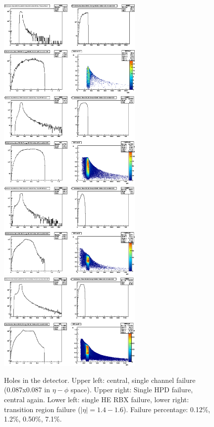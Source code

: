 \documentclass{fheadnote}
\begin{document}
\begin{figure}[htbp]
   \centering
   \includegraphics[width=7cm]{Figures/MRToy15_SingleChannel}
   \includegraphics[width=7cm]{Figures/MRToy15_HBHPD}\\
   \includegraphics[width=7cm]{Figures/MRToy15_HERBX}
   \includegraphics[width=7cm]{Figures/MRToy15_Transition}
   \caption{Holes in the detector.  Upper left: central, single channel failure (0.087x0.087 in $\eta-\phi$ space).  Upper right: Single HPD failure, central again.
   Lower left: single HE RBX failure, lower right: transition region failure ($|\eta| = 1.4-1.6$).  Failure percentage: 0.12\%, 1.2\%, 0.50\%, 7.1\%.}
   \label{Figure_MRToy15}
\end{figure}
\end{document}
